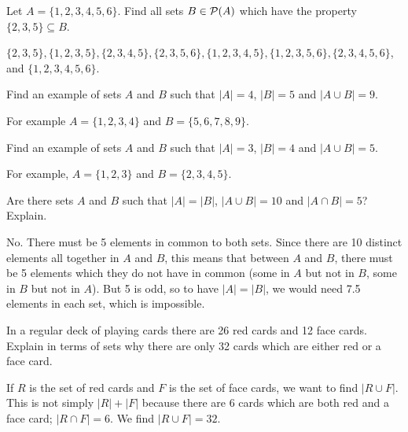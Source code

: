 \begin{questions}
  
  
\question Let $A = \{1,2,3,4,5,6\}$.  Find all sets $B \in \mathcal P(A)$ which have the property $\{2,3,5\} \subseteq B$.

  \begin{answer}
      $\{2,3,5\}, \{1,2,3,5\}, \{2,3,4,5\}, \{2,3,5,6\}, \{1,2,3,4,5\}, \{1,2,3,5,6\}, \{2,3,4,5,6\}$, and $\{1,2,3,4,5,6\}$.
  \end{answer}


  
\question Find an example of sets $A$ and $B$ such that $|A| = 4$, $|B| = 5$ and $|A \cup B| = 9$.  

  \begin{answer}
   For example $A = \{1,2,3,4\}$ and $B = \{5,6,7,8,9\}$.
  \end{answer}

  
  

\question Find an example of sets $A$ and $B$ such that $|A| = 3$, $|B| = 4$ and $|A \cup B| = 5$.

  \begin{answer}
    For example, $A = \{1,2,3\}$ and $B = \{2,3,4,5\}$.
  \end{answer}

\question Are there sets $A$ and $B$ such that $|A| = |B|$, $|A\cup B| = 10$ and $|A\cap B| = 5$?  Explain.

	\begin{answer}
	 No.  There must be 5 elements in common to both sets.  Since there are 10 distinct elements all together in $A$ and $B$, this means that between $A$ and $B$, there must be 5 elements which they do not have in common (some in $A$ but not in $B$, some in $B$ but not in $A$).  But 5 is odd, so to have $|A| = |B|$, we would need 7.5 elements in each set, which is impossible.
	\end{answer}

\question In a regular deck of playing cards there are 26 red cards and 12 face cards.  Explain in terms of sets why there are only 32 cards which are either red or a face card.

  \begin{answer}
      If $R$ is the set of red cards and $F$ is the set of face cards, we want to find $|R \cup F|$.  This is not simply $|R| + |F|$ because there are 6 cards which are both red and a face card; $|R \cap F| = 6$.  We find $|R \cup F| = 32$.
  \end{answer}


\end{questions}